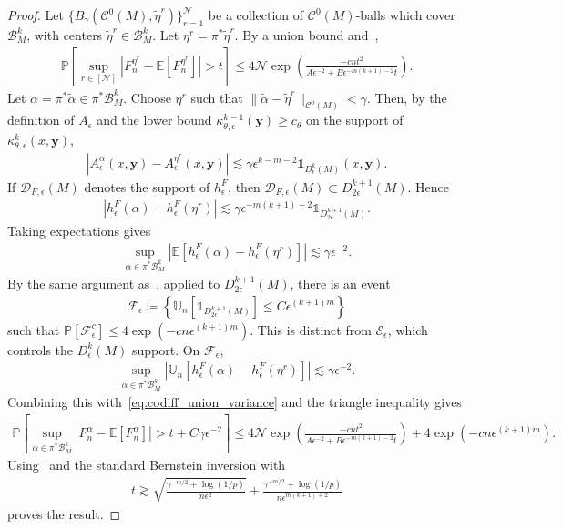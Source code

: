 \documentclass[10pt,a4paper]{amsart}
\newcommand{\E}{\mathbb{E}}
\newcommand{\PP}{\mathbb{P}}
\newcommand{\U}{\mathbb{U}}
\newcommand{\ball}[3]{B_{#3}(#1, #2)} %
\newcommand{\by}{\mathbf{y}}
\newcommand{\cB}{\mathcal{B}}
\newcommand{\cC}{\mathcal{C}}
\newcommand{\cD}{\mathcal{D}}
\newcommand{\cE}{\mathcal{E}}
\newcommand{\cF}{\mathcal{F}}
\newcommand{\cN}{\mathcal{N}}
\newcommand{\ls}{\lesssim}
\newcommand{\one}{\mathbb{1}}
\newcommand{\talpha}{\tilde{\alpha}}
\newcommand{\teta}{\tilde{\eta}}
\begin{document}
\begin{proof}
    Let $\{\ball{\cC^0(M)}{\teta^r}{\gamma}\}_{r=1}^{\cN}$ be a collection of $\cC^0(M)$-balls which cover $\cB_M^k$, with centers $\teta^r\in\cB_M^k$. Let $\eta^r=\pi^*\teta^r$. By a union bound and~,
    \begin{align} \label{eq:codiff_union_variance}
        \PP\left[\sup_{r\in[\cN]}|F_n^{\eta^r}-\E[F_n^{\eta^r}]|>t\right]
        \leq 4\cN\exp\left(\frac{-cnt^2}{A\epsilon^{-2}+B\epsilon^{-m(k+1)-2}t}\right).
    \end{align}
    Let $\alpha=\pi^*\talpha\in\pi^*\cB_M^k$. Choose $\eta^r$ such that $\|\talpha-\teta^r\|_{\cC^0(M)}<\gamma$. Then, by the definition of $A_\epsilon$ and the lower bound $\kappa_{\theta,\epsilon}^{k-1}(\by)\geq c_\theta$ on the support of $\kappa_{\theta,\epsilon}^{k}(x,\by)$,
    \begin{align}
        |A^\alpha_\epsilon(x,\by)-A^{\eta^r}_\epsilon(x,\by)|\ls \gamma\epsilon^{k-m-2}\one_{D^k_\epsilon(M)}(x,\by).
    \end{align}
    If $\cD_{F,\epsilon}(M)$ denotes the support of $h^F_\epsilon$, then $\cD_{F,\epsilon}(M)\subset D^{k+1}_{2\epsilon}(M)$. Hence
    \begin{align}
        |h^F_\epsilon(\alpha)-h^F_\epsilon(\eta^r)|\ls \gamma\epsilon^{-m(k+1)-2}\one_{D^{k+1}_{2\epsilon}(M)}.
    \end{align}
    Taking expectations gives
    \begin{align}
        \sup_{\alpha\in\pi^*\cB_M^k}|\E[h^F_\epsilon(\alpha)-h^F_\epsilon(\eta^r)]|\ls \gamma\epsilon^{-2}.
    \end{align}
    By the same argument as~, applied to $D^{k+1}_{2\epsilon}(M)$, there is an event
    \begin{align}
        \cF_\epsilon \coloneqq \left\{\U_n[\one_{D^{k+1}_{2\epsilon}(M)}]\leq C\epsilon^{(k+1)m}\right\}
    \end{align}
    such that $\PP[\cF_\epsilon^c]\leq 4\exp(-cn\epsilon^{(k+1)m})$. This is distinct from $\cE_\epsilon$, which controls the $D^k_\epsilon(M)$ support. On $\cF_\epsilon$,
    \begin{align}
        \sup_{\alpha\in\pi^*\cB_M^k}|\U_n[h^F_\epsilon(\alpha)-h^F_\epsilon(\eta^r)]|\ls \gamma\epsilon^{-2}.
    \end{align}
    Combining this with~\eqref{eq:codiff_union_variance} and the triangle inequality gives
    \begin{align}
        \PP\left[\sup_{\alpha\in\pi^*\cB_M^k}|F_n^\alpha-\E[F_n^\alpha]|>t+C\gamma\epsilon^{-2}\right]
        \leq 4\cN\exp\left(\frac{-cnt^2}{A\epsilon^{-2}+B\epsilon^{-m(k+1)-2}t}\right)+4\exp(-cn\epsilon^{(k+1)m}).
    \end{align}
    Using~ and the standard Bernstein inversion with
    \begin{align}
        t\gtrsim \sqrt{\frac{\gamma^{-m/2}+\log(1/p)}{n\epsilon^2}}
        +\frac{\gamma^{-m/2}+\log(1/p)}{n\epsilon^{m(k+1)+2}}
    \end{align}
    proves the result.
\end{proof}
\end{document}

